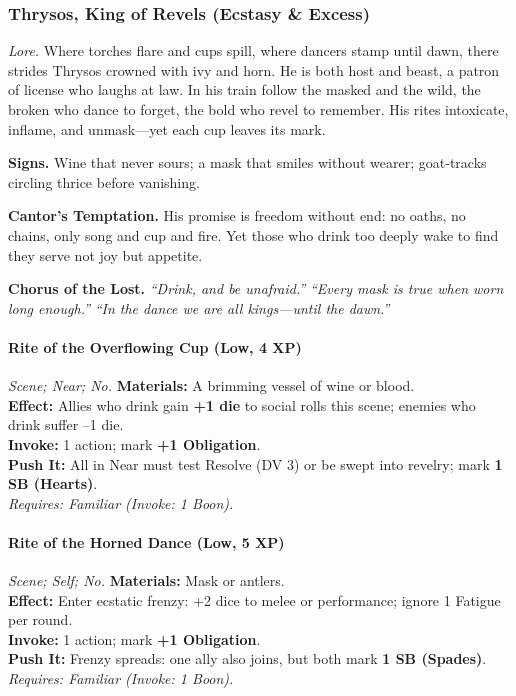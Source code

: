 
\subsubsection{Thrysos, King of Revels (Ecstasy \& Excess)}
\textit{Lore.} Where torches flare and cups spill, where dancers stamp until dawn, there strides Thrysos crowned with ivy and horn. He is both host and beast, a patron of license who laughs at law. In his train follow the masked and the wild, the broken who dance to forget, the bold who revel to remember. His rites intoxicate, inflame, and unmask—yet each cup leaves its mark.

\textbf{Signs.} Wine that never sours; a mask that smiles without wearer; goat-tracks circling thrice before vanishing.

\textbf{Cantor’s Temptation.} His promise is freedom without end: no oaths, no chains, only song and cup and fire. Yet those who drink too deeply wake to find they serve not joy but appetite.

\textbf{Chorus of the Lost.}  
\emph{“Drink, and be unafraid.”}  
\emph{“Every mask is true when worn long enough.”}  
\emph{“In the dance we are all kings—until the dawn.”}

\paragraph*{Rite of the Overflowing Cup (Low, 4 XP)} \emph{Scene; Near; No.}
\textbf{Materials:} A brimming vessel of wine or blood.\\
\textbf{Effect:} Allies who drink gain \textbf{+1 die} to social rolls this scene; enemies who drink suffer --1 die.\\
\textbf{Invoke:} 1 action; mark \textbf{+1 Obligation}.\\
\textbf{Push It:} All in Near must test Resolve (DV 3) or be swept into revelry; mark \textbf{1 SB (Hearts)}.\\
\emph{Requires: Familiar (\textit{Invoke:} 1 Boon).}

\paragraph*{Rite of the Horned Dance (Low, 5 XP)} \emph{Scene; Self; No.}
\textbf{Materials:} Mask or antlers.\\
\textbf{Effect:} Enter ecstatic frenzy: +2 dice to melee or performance; ignore 1 Fatigue per round.\\
\textbf{Invoke:} 1 action; mark \textbf{+1 Obligation}.\\
\textbf{Push It:} Frenzy spreads: one ally also joins, but both mark \textbf{1 SB (Spades)}.\\
\emph{Requires: Familiar (\textit{Invoke:} 1 Boon).}

